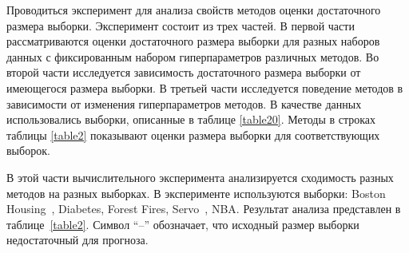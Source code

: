 Проводиться эксперимент для анализа свойств методов оценки достаточного размера выборки. Эксперимент состоит из трех частей.
В первой части рассматриваются оценки достаточного размера выборки для разных наборов данных с фиксированным набором гиперпараметров различных методов.
Во второй части исследуется зависимость достаточного размера выборки от имеющегося размера выборки. В третьей части исследуется поведение методов в зависимости от изменения гиперпараметров методов. В качестве данных использовались выборки, описанные в таблице \ref{table20}. Методы в строках таблицы \ref{table2} показывают оценки размера выборки для соответствующих выборок.
 
\begin{table}[!hbp]
\centering
\caption{Эксперимент по оценке размера выборки для различных наборов выборок}
\label{table2}
\end{table}

В этой части вычислительного эксперимента анализируется сходимость разных методов на разных выборках. В эксперименте используются выборки: Boston Housing~\cite{Boston}, Diabetes, Forest Fires, Servo~\cite{servo}, NBA.
Результат анализа представлен в таблице~\ref{table2}. Символ ``--'' обозначает, что исходный размер выборки недостаточный для прогноза.

